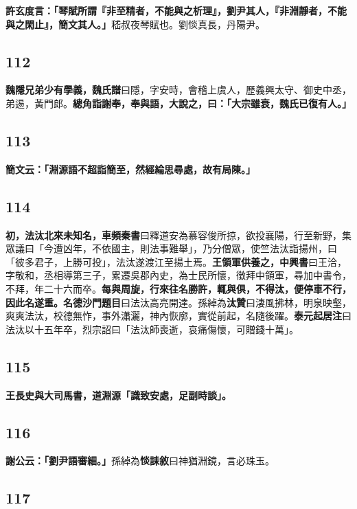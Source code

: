 \textbf{許玄度言：「琴賦所謂『非至精者，不能與之析理』，劉尹其人，『非淵靜者，不能與之閑止』，簡文其人。」}{\footnotesize 嵇叔夜琴賦也。劉惔真長，丹陽尹。}

\subsection*{112}

\textbf{魏隱兄弟少有學義，}{\footnotesize \textbf{魏氏譜}曰隱，字安時，會稽上虞人，歷義興太守、御史中丞，弟逷，黃門郎。}\textbf{總角詣謝奉，奉與語，大說之，曰：「大宗雖衰，魏氏已復有人。」}

\subsection*{113}

\textbf{簡文云：「淵源語不超詣簡至，然經綸思尋處，故有局陳。」}

\subsection*{114}

\textbf{初，法汰北來未知名，}{\footnotesize \textbf{車頻秦書}曰釋道安為慕容俊所掠，欲投襄陽，行至新野，集眾議曰「今遭凶年，不依國主，則法事難舉」，乃分僧眾，使竺法汰詣揚州，曰「彼多君子，上勝可投」，法汰遂渡江至揚土焉。}\textbf{王領軍供養之，}{\footnotesize \textbf{中興書}曰王洽，字敬和，丞相導第三子，累遷吳郡內史，為士民所懷，徵拜中領軍，尋加中書令，不拜，年二十六而卒。}\textbf{每與周旋，行來往名勝許，輒與俱，不得汰，便停車不行，因此名遂重。}{\footnotesize \textbf{名德沙門題目}曰法汰高亮開達。孫綽為\textbf{汰贊}曰淒風拂林，明泉映壑，爽爽法汰，校德無怍，事外瀟灑，神內恢廓，實從前起，名隨後躍。\textbf{泰元起居注}曰法汰以十五年卒，烈宗詔曰「法汰師喪逝，哀痛傷懷，可贈錢十萬」。}

\subsection*{115}

\textbf{王長史與大司馬書，道淵源「識致安處，足副時談」。}

\subsection*{116}

\textbf{謝公云：「劉尹語審細。」}{\footnotesize 孫綽為\textbf{惔誄敘}曰神猶淵鏡，言必珠玉。}

\subsection*{117}

